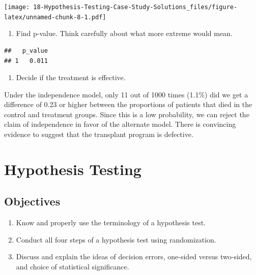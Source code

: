 \documentclass[
]{book}
\newenvironment{Shaded}{\begin{snugshade}}{\end{snugshade}}
\newcommand{\DataTypeTok}[1]{\textcolor[rgb]{0.13,0.29,0.53}{#1}}
\newcommand{\KeywordTok}[1]{\textcolor[rgb]{0.13,0.29,0.53}{\textbf{#1}}}
\newcommand{\NormalTok}[1]{#1}
\newcommand{\OperatorTok}[1]{\textcolor[rgb]{0.81,0.36,0.00}{\textbf{#1}}}
\newcommand{\StringTok}[1]{\textcolor[rgb]{0.31,0.60,0.02}{#1}}
\providecommand{\tightlist}{%
  \setlength{\itemsep}{0pt}\setlength{\parskip}{0pt}}
\begin{document}
\texttt{[image: 18-Hypothesis-Testing-Case-Study-Solutions\_files/figure-latex/unnamed-chunk-8-1.pdf]}

\begin{enumerate}
\def\labelenumi{\alph{enumi}.}
\setcounter{enumi}{6}
\tightlist
\item
  Find p-value. Think carefully about what more extreme would mean.
\end{enumerate}

\begin{Shaded}
\end{Shaded}

\begin{verbatim}
##   p_value
## 1   0.011
\end{verbatim}

\begin{enumerate}
\def\labelenumi{\alph{enumi}.}
\setcounter{enumi}{7}
\tightlist
\item
  Decide if the treatment is effective.
\end{enumerate}

Under the independence model, only 11 out of 1000 times (1.1\%) did we get a difference of 0.23 or higher between the proportions of patients that died in the control and treatment groups. Since this is a low probability, we can reject the claim of independence in favor of the alternate model. There is convincing evidence to suggest that the transplant program is defective.

\hypertarget{HYPOTEST}{%
\chapter{Hypothesis Testing}\label{HYPOTEST}}

\hypertarget{objectives-18}{%
\section{Objectives}\label{objectives-18}}

\begin{enumerate}
\def\labelenumi{\arabic{enumi})}
\tightlist
\item
  Know and properly use the terminology of a hypothesis test.\\
\item
  Conduct all four steps of a hypothesis test using randomization.\\
\item
  Discuss and explain the ideas of decision errors, one-sided versus two-sided, and choice of statistical significance.
\end{enumerate}
\end{document}
